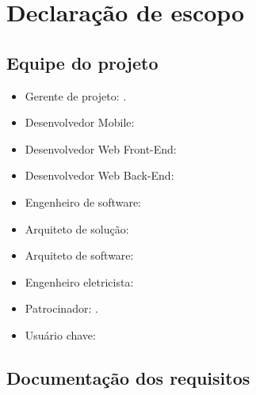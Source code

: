 
\chapter{Declaração de escopo}

\section{Equipe do projeto}

\begin{itemize}
	\item Gerente de projeto: \projectManagerName.
	\item Desenvolvedor Mobile:
	\item Desenvolvedor Web Front-End:
	\item Desenvolvedor Web Back-End:
	\item Engenheiro de software:
	\item Arquiteto de solução:
	\item Arquiteto de software:
	\item Engenheiro eletricista:
	\item Patrocinador: \projectSponsorName.
	\item Usuário chave:
\end{itemize}


\section{Documentação dos requisitos}


